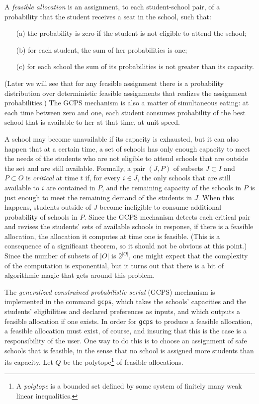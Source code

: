 \documentclass[12pt]{article}
\theoremstyle{definition}
\begin{document}
A \emph{feasible allocation} is an assignment, to each student-school
pair, of a probability that the student receives a seat in the school,
such that:
\begin{enumerate}
  \item[(a)] the probability is zero if the student is not eligible to
    attend the school;
  \item[(b)] for each student, the sum of her probabilities is one;
  \item[(c)] for each school the sum of its probabilities is not
    greater than its capacity.
\end{enumerate}
(Later we will see that for any feasible assignment there is a
probability distribution over deterministic feasible assignments that
realizes the assignment probabilities.)  The GCPS mechanism is also a
matter of simultaneous eating: at each time between zero and one, each
student consumes probability of the best school that is available to
her at that time, at unit speed.

A school may become unavailable if its capacity is exhausted, but it
can also happen that at a certain time, a set of schools has only
enough capacity to meet the needs of the students who are not eligible
to attend schools that are outside the set and are still available.
Formally, a pair $(J,P)$ of subsets $J \subset I$ and $P \subset O$ is
\emph{critical} at time $t$ if, for every $i \in J$, the only schools
that are still available to $i$ are contained in $P$, and the
remaining capacity of the schools in $P$ is just enough to meet the
remaining demand of the students in $J$.  When this happens, students
outside of $J$ become ineligible to consume additional probability of
schools in $P$.  Since the GCPS mechanism detects each critical pair
and revises the students' sets of available schools in response, if
there is a feasible allocation, the allocation it computes at time one
is feasible.  (This is a consequence of a significant theorem, so it
should not be obvious at this point.)  Since the number of subsets of
$|O|$ is $2^{|O|}$, one might expect that the complexity of the
computation is exponential, but it turns out that there is a bit of
algorithmic magic that gets around this problem.

The \emph{generalized constrained probabilistic serial} (GCPS)
mechanism is implemented in the command \texttt{gcps}, which takes the
schools' capacities and the students' eligibilities and declared
preferences as inputs, and which outputs a feasible allocation if one
exists.  In order for \texttt{gcps} to produce a feasible allocation,
a feasible allocation must exist, of course, and insuring that this is
the case is a responsibility of the user.  One way to do this is to
choose an assignment of safe schools that is feasible, in the sense
that no school is assigned more students than its capacity.  Let $Q$
be the polytope\footnote{A \emph{polytope} is a bounded set defined by
some system of finitely many weak linear inequalities.} of feasible
allocations.
\end{document}
